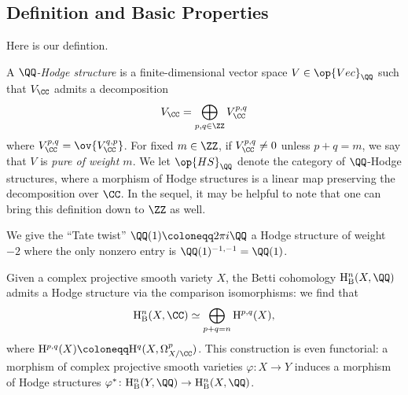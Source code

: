 \documentclass[../thesis.tex]{subfiles}
\begin{document}
\subsection{Definition and Basic Properties}
Here is our defintion.
\begin{definition}
	A \textit{$\QQ$-Hodge structure} is a finite-dimensional vector space $V\in\op{Vec}_\QQ$ such that $V_\CC$ admits a decomposition
	\[V_\CC=\bigoplus_{p,q\in\ZZ}V^{p,q}_\CC\]
	where $V^{p,q}_\CC=\ov{V^{q,p}_\CC}$. For fixed $m\in\ZZ$, if $V^{p,q}_\CC\ne0$ unless $p+q=m$, we say that $V$ is \textit{pure of weight $m$}. We let $\op{HS}_\QQ$ denote the category of $\QQ$-Hodge structures, where a morphism of Hodge structures is a linear map preserving the decomposition over $\CC$. In the sequel, it may be helpful to note that one can bring this definition down to $\ZZ$ as well.
\end{definition}
\begin{example}
	We give the ``Tate twist'' $\QQ(1)\coloneqq2\pi i\QQ$ a Hodge structure of weight $-2$ where the only nonzero entry is $\QQ(1)^{-1,-1}=\QQ(1)$.
\end{example}
\begin{example}
	Given a complex projective smooth variety $X$, the Betti cohomology $\mathrm H^n_{\mathrm B}(X,\QQ)$ admits a Hodge structure via the comparison isomorphisms: we find that
	\[\mathrm H^n_{\mathrm B}(X,\CC)\simeq\bigoplus_{p+q=n}\mathrm H^{p,q}(X),\]
	where $\mathrm H^{p,q}(X)\coloneqq\mathrm H^q(X,\Omega_{X/\CC}^p)$. This construction is even functorial: a morphism of complex projective smooth varieties $\varphi\colon X\to Y$ induces a morphism of Hodge structures $\varphi^*\colon\mathrm H^n_{\mathrm B}(Y,\QQ)\to\mathrm H^n_{\mathrm B}(X,\QQ)$.
\end{example}
\end{document}
